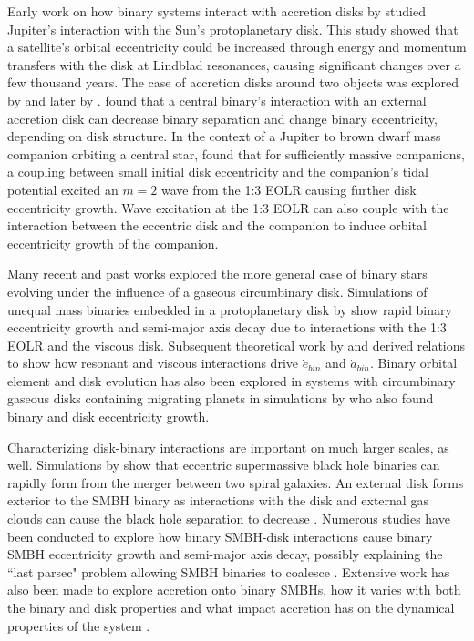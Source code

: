 Early work on how binary systems interact with accretion disks by \citet{Goldreich1980} studied Jupiter's interaction with the Sun's protoplanetary disk.  This study showed that a satellite's orbital eccentricity could be increased through energy and momentum transfers with the disk at Lindblad resonances, causing significant changes over a few thousand years.  The case of accretion disks around two objects was explored by \citet{Pringle1991} and later by \citet{Papaloizou2001}.  \citet{Pringle1991} found that a central binary's interaction with an external accretion disk can decrease binary separation and change binary eccentricity, depending on disk structure.  In the context of a Jupiter to brown dwarf mass companion orbiting a central star,  \citet{Papaloizou2001} found that for sufficiently massive companions, a coupling between small initial disk eccentricity and the companion's
tidal potential excited an $m = 2$ wave from the 1:3 EOLR causing further disk eccentricity growth.  Wave excitation at the 1:3 EOLR can also couple with the interaction between the eccentric disk and the companion to induce orbital eccentricity growth of the companion.  

Many recent and past works explored the more general case of binary stars evolving under the influence of a gaseous circumbinary disk.  Simulations of unequal mass binaries embedded in a protoplanetary disk by \citet{Artymowicz1991} show rapid binary eccentricity growth and semi-major axis decay due to interactions with the 1:3 EOLR and the viscous disk.  Subsequent theoretical work by \citet{Artymowicz1996b} and \citet{Artymowicz2000} derived relations to show how resonant and viscous interactions drive $\dot{e}_{bin}$ and $\dot{a}_{bin}$.  Binary orbital element and disk evolution has also been explored in systems with circumbinary gaseous disks containing migrating planets in simulations by \citet{Pierens2007} who also found binary and disk eccentricity growth.

Characterizing disk-binary interactions are important on much larger scales, as well.  Simulations by \citet{Mayer2007} show that eccentric supermassive
black hole binaries can rapidly form from the merger between two spiral galaxies.  An external disk forms exterior to the SMBH binary
as interactions with the disk and external gas clouds can cause the black hole separation to decrease \citep{Roskar2015}.  Numerous studies have been 
conducted to explore how binary SMBH-disk interactions cause binary SMBH eccentricity growth and semi-major axis decay, possibly 
explaining the ``last parsec" problem allowing SMBH binaries to coalesce \citep[e.g.][]{Armitage2005,Escala2005,Cuadra2009,Roedig2012,Aly2015}.  Extensive work
has also been made to explore accretion onto binary SMBHs, how it varies with both the binary and disk properties and what impact accretion
has on the dynamical properties of the system \citep[e.g.][]{Shi2012,DOrazio2013,Nixon2013,Farris2014}.
 
